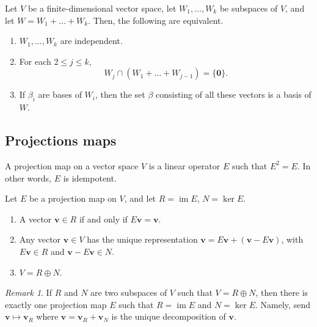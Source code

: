 \documentclass[11pt]{article}
\renewcommand{\vec}[1]{\boldsymbol{#1}}
\newcommand{\vv}{\vec{v}}
\renewcommand{\ker}{\operatorname{ker}}
\newcommand{\im}{\operatorname{im}}
\theoremstyle{definition}
\theoremstyle{remark}
\newtheorem*{remark}{Remark}
\numberwithin{equation}{section}
\begin{document}
    \begin{lemma}
        Let $V$ be a finite-dimensional vector space, let $W_1, \dots, W_k$ be
        subspaces of $V$, and let $W = W_1 + \dots + W_k$. Then, the following are
        equivalent. \begin{enumerate}
            \itemsep0em
            \item $W_1, \dots, W_k$ are independent.
            \item For each $2 \leq j \leq k$, \[
                W_j \cap (W_1 + \dots + W_{j - 1}) = \{\vec{0}\}.
            \]
            \item If $\beta_i$ are bases of $W_i$, then the set $\beta$ consisting of
            all these vectors is a basis of $W$.
        \end{enumerate}
    \end{lemma}

    \subsection{Projections maps}
    \begin{definition}
        A projection map on a vector space $V$ is a linear operator $E$ such that
        $E^2 = E$. In other words, $E$ is idempotent.
    \end{definition}

    \begin{lemma}
        Let $E$ be a projection map on $V$, and let $R = \im{E}$, $N = \ker{E}$.
        \begin{enumerate}
            \itemsep0em
            \item A vector $\vv \in R$ if and only if $E\vv = \vv$.
            \item Any vector $\vv \in V$ has the unique representation $\vv =
            E\vv + (\vv - E\vv)$, with $E\vv \in R$ and $\vv - E\vv \in N$.
            \item $V = R\oplus N$.
        \end{enumerate}
        \begin{remark}
            If $R$ and $N$ are two subspaces of $V$ such that $V = R\oplus N$, then
            there is exactly one projection map $E$ such that $R = \im{E}$ and $N =
            \ker{E}$. Namely, send $\vv \mapsto \vv_R$ where $\vv = \vv_R + \vv_N$ is
            the unique decomposition of $\vv$.
        \end{remark}
    \end{lemma}
\end{document}
